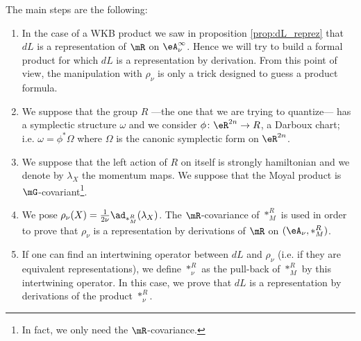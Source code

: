 The main steps are the following:
{\renewcommand{\theenumi}{\arabic{enumi}.}
\begin{enumerate}
\item In the case of a WKB product we saw in proposition \ref{prop:dL_reprez} that $dL$ is a representation of $\mR$ on $\eA_{\nu}^{\infty}$. Hence we will try to build a formal product for which $dL$ is a representation by derivation. From this point of view, the manipulation with $\rho_{\nu}$ is only a trick designed to guess a product formula.

\item We suppose that the group $R$ ---the one that we are trying to quantize--- has a symplectic structure $\omega$ and we consider $\phi\colon \eR^{2n}\to R$, a Darboux chart; i.e. $\omega=\phi^*\Omega$ where $\Omega$ is the canonic symplectic form on $\eR^{2n}$.

\item We suppose that the left action of $R$ on itself is strongly hamiltonian and we denote by $\lambda_X$ the momentum maps. We suppose that the Moyal product is $\mG$-covariant\footnote{In fact, we only need the $\mR$-covariance.}.

\item We pose $\rho_{\nu}(X)=\frac{1}{ 2\nu }\ad_{\ast_M^R}(\lambda_X)$. The $\mR$-covariance of $\ast_M^R$ is used in order to prove that $\rho_{\nu}$ is a  representation by derivations of $\mR$ on $(\eA_{\nu},\ast_M^R)$. 
\item If one can find an intertwining operator between $dL$ and $\rho_{\nu}$ (i.e. if they are equivalent representations), we define $\ast_{\nu}^R$ as the pull-back of $\ast_M^R$ by this intertwining operator. In this case, we prove that $dL$ is a representation by derivations of the product $\ast_{\nu}^R$.
\end{enumerate}

}		%

